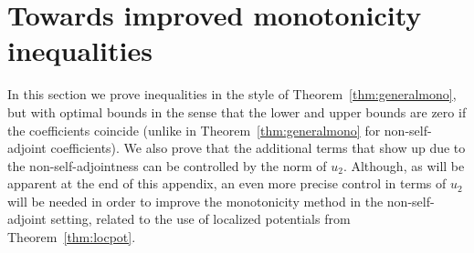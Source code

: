 \documentclass[reqno]{amsart}
\numberwithin{equation}{section}
\numberwithin{figure}{section}
\numberwithin{table}{section}
\theoremstyle{plain}
\theoremstyle{definition}
\theoremstyle{remark}
\begin{document}
	\section{Towards improved monotonicity inequalities} \label{appA}
	
	In this section we prove inequalities in the style of Theorem~\ref{thm:generalmono}, but with optimal bounds in the sense that the lower and upper bounds are zero if the coefficients coincide (unlike in Theorem~\ref{thm:generalmono} for non-self-adjoint coefficients). We also prove that the additional terms that show up due to the non-self-adjointness can be controlled by the norm of $u_2$. Although, as will be apparent at the end of this appendix, an even more precise control in terms of $u_2$ will be needed in order to improve the monotonicity method in the non-self-adjoint setting, related to the use of localized potentials from Theorem~\ref{thm:locpot}.
	
\end{document}
